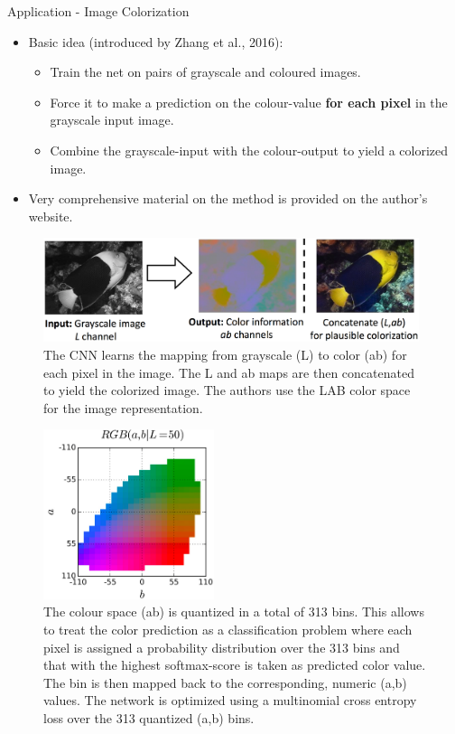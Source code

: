 \begin{vbframe}{Application - Image Colorization}
    \begin{itemize}
        \item Basic idea (introduced by Zhang et al., 2016):
        \begin{itemize}
            \item Train the net on pairs of grayscale and coloured images.
            \item Force it to make a prediction on the colour-value \textbf{for each pixel} in the grayscale input image.
            \item Combine the grayscale-input with the colour-output to yield a colorized image.
        \end{itemize}
        \item Very comprehensive material on the method is provided on the author's website. \href{http://richzhang.github.io/colorization/}{}
            \end{itemize}
            \framebreak
            \begin{figure}
            \centering
            \includegraphics[width=11cm]{figure/fish_lab.png}
            \caption{The CNN learns the mapping from grayscale (L) to color (ab) for each pixel in the image. The L and ab maps are then concatenated to yield the colorized image. The authors use the LAB color space for the image representation.}
            \end{figure}
            \framebreak
            \begin{figure}
            \centering
            \includegraphics[width=5cm]{figure/lab.png}
            \caption{The colour space (ab) is quantized in a total of 313 bins. This allows to treat the color prediction as a classification problem where each pixel is assigned a probability distribution over the 313 bins and that with the highest softmax-score is taken as predicted color value. The bin is then mapped back to the corresponding, numeric (a,b) values. The network is optimized using a multinomial cross entropy loss over the 313 quantized (a,b) bins.}

\end{figure}
\end{vbframe}
